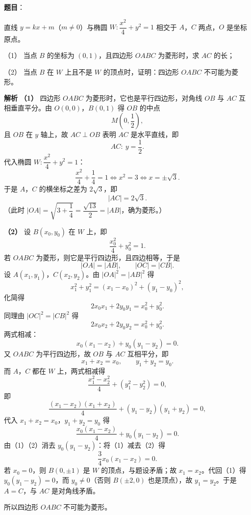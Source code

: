 \begin{answer}

\textbf{题目}：

直线 $y=kx+m$（$m\neq0$）与椭圆 $W:\dfrac{x^2}4+y^2=1$ 相交于 $A$，$C$ 两点，$O$ 是坐标原点。

（1） 当点 $B$ 的坐标为 $(0,1)$，且四边形 $OABC$ 为菱形时，求 $AC$ 的长；

（2） 当点 $B$ 在 $W$ 上且不是 $W$ 的顶点时，证明：四边形 $OABC$ 不可能为菱形。

\textbf{解析}
\textbf{（1）} 四边形 $OABC$ 为菱形时，它也是平行四边形，对角线 $OB$ 与 $AC$ 互相垂直平分。由 $O(0,0)$，$B(0,1)$ 得 $OB$ 的中点
\nopagebreak[4]
\[M\left(0,\frac12\right),\]
且 $OB$ 在 $y$ 轴上，故 $AC\perp OB$ 表明 $AC$ 是水平直线，即
\nopagebreak[4]
\[AC:\ y=\frac12.\]
代入椭圆 $W:\dfrac{x^2}4+y^2=1$：
\nopagebreak[4]
\[\frac{x^2}4+\frac14=1\iff x^2=3\iff x=\pm\sqrt3.\]
于是 $A$，$C$ 的横坐标之差为 $2\sqrt3$，即
\nopagebreak[4]
\[|AC|=2\sqrt3.\]
（此时 $|OA|=\sqrt{3+\dfrac14}=\dfrac{\sqrt{13}}2=|AB|$，确为菱形。）

\textbf{（2）} 设 $B(x_0,y_0)$ 在 $W$ 上，即
\nopagebreak[4]
\[\frac{x_0^2}4+y_0^2=1.\]
若 $OABC$ 为菱形，则它是平行四边形，且四边相等，于是
\nopagebreak[4]
\[|OA|=|AB|,\qquad |OC|=|CB|.\]
设 $A(x_1,y_1)$，$C(x_2,y_2)$。由 $|OA|^2=|AB|^2$ 得
\nopagebreak[4]
\[x_1^2+y_1^2=(x_1-x_0)^2+(y_1-y_0)^2,\]
化简得
\nopagebreak[4]
\[2x_0x_1+2y_0y_1=x_0^2+y_0^2.\]
同理由 $|OC|^2=|CB|^2$ 得
\nopagebreak[4]
\[2x_0x_2+2y_0y_2=x_0^2+y_0^2.\]
两式相减：
\nopagebreak[4]
\[x_0(x_1-x_2)+y_0(y_1-y_2)=0.\tag{1}\]
又 $OABC$ 为平行四边形，故 $OB$ 与 $AC$ 互相平分，即
\nopagebreak[4]
\[x_1+x_2=x_0,\qquad y_1+y_2=y_0.\]
而 $A$，$C$ 都在 $W$ 上，两式相减得
\nopagebreak[4]
\[\frac{x_1^2-x_2^2}4+(y_1^2-y_2^2)=0,\]
即
\nopagebreak[4]
\[\frac{(x_1-x_2)(x_1+x_2)}4+(y_1-y_2)(y_1+y_2)=0,\]
代入 $x_1+x_2=x_0$，$y_1+y_2=y_0$ 得
\nopagebreak[4]
\[\frac{x_0(x_1-x_2)}4+y_0(y_1-y_2)=0.\tag{2}\]
由（1）（2）消去 $y_0(y_1-y_2)$：将（1）减去（2）得
\nopagebreak[4]
\[\frac34x_0(x_1-x_2)=0.\]
若 $x_0=0$，则 $B(0,\pm1)$ 是 $W$ 的顶点，与题设矛盾；故 $x_1=x_2$。代回（1）得 $y_0(y_1-y_2)=0$，而 $y_0\neq0$（否则 $B(\pm2,0)$ 也是顶点），故 $y_1=y_2$。于是 $A=C$，与 $AC$ 是对角线矛盾。

所以四边形 $OABC$ 不可能为菱形。



\end{answer}
